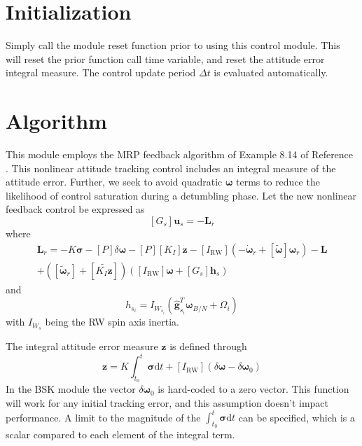 \documentclass[]{BasiliskReportMemo}
\begin{document}
\section{Initialization}
Simply call the module reset function prior to using this control module.  This will reset the prior function call time variable, and reset the attitude error integral measure.  The control update period $\Delta t$ is evaluated automatically.  

\section{Algorithm}\label{sec:alg}
		 This module employs the MRP feedback algorithm of Example 8.14 of Reference .  This  nonlinear attitude tracking control includes an integral measure of the attitude error.  Further, we seek to avoid quadratic $\bm\omega$ terms to reduce the likelihood of control saturation during a detumbling phase.  Let the new nonlinear feedback control be expressed as
		\begin{equation}
			\label{eq:GusRW}
			[G_{s}]\bm u_{s} = -\bm L_{r} 
		\end{equation}
		where
		\begin{multline}
			\label{eq:Lr}
			\bm L_{r} =  -K \bm\sigma - [P] \delta\bm\omega - [P][K_{I}] \bm z  - [I_{\text{RW}}](-\dot{\bm\omega}_{r} + [\tilde{\bm\omega}]\bm\omega_{r}) - \bm L
			\\
			+ ([\tilde{\bm \omega}_{r}] + [\widetilde{K_{I}\bm z}])
			\left([I_{\text{RW}}]\bm\omega + [G_{s}]\bm h_{s} \right)
		\end{multline}
		and 
		\begin{equation}
			h_{s_{i}} = I_{W_{s_{i}}} (\hat{\bm g}_{s_{i}}^{T} \bm\omega_{B/N} + \Omega_{i})
		\end{equation}
		with $I_{W_{s}}$ being the RW spin axis inertia.

		The integral attitude error measure $\bm z$ is defined through
		\begin{equation*}
			\bm z = K \int_{t_{0}}^{t} \bm\sigma \text{d}t + [I_{\text{RW}}](\delta\bm\omega - \delta\bm\omega_{0})
		\end{equation*}
		In the BSK module the vector $\delta\bm\omega_{0}$ is hard-coded to a zero vector.  This function will work for any initial tracking error, and this assumption doesn't impact performance. A limit to the magnitude of the $\int_{t_{0}}^{t} \bm\sigma \text{d}t $ can be specified, which is a scalar compared to each element of the integral term. 
		
\end{document}
